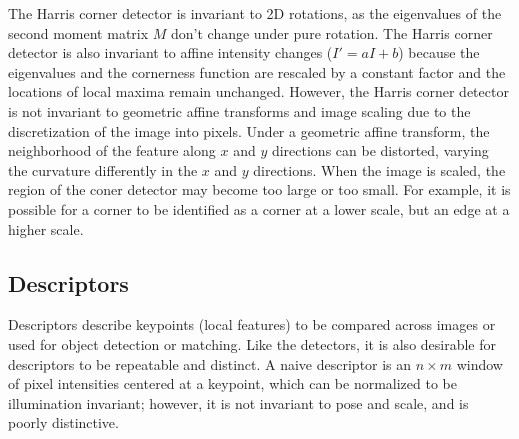 \documentclass[twoside]{article}
\begin{document}
The Harris corner detector is invariant to 2D rotations, as the eigenvalues of the second moment matrix $M$ don't change under pure rotation. The Harris corner detector is also invariant to affine intensity changes ($I' = aI+b$) because the eigenvalues and the cornerness function are rescaled by a constant factor and the locations of local maxima remain unchanged. However, the Harris corner detector is not invariant to geometric affine transforms and image scaling due to the discretization of the image into pixels. Under a geometric affine transform, the neighborhood of the feature along $x$ and $y$ directions can be distorted, varying the curvature differently in the $x$ and $y$ directions. When the image is scaled, the region of the coner detector may become too large or too small. For example, it is possible for a corner to be identified as a corner at a lower scale, but an edge at a higher scale.

\subsection{Descriptors}
Descriptors describe keypoints (local features) to be compared across images or used for object detection or matching. Like the detectors, it is also desirable for descriptors to be repeatable and distinct. A naive descriptor is an $n\times m$ window of pixel intensities centered at a keypoint, which can be normalized to be illumination invariant; however, it is not invariant to pose and scale, and is poorly distinctive.
\end{document}
